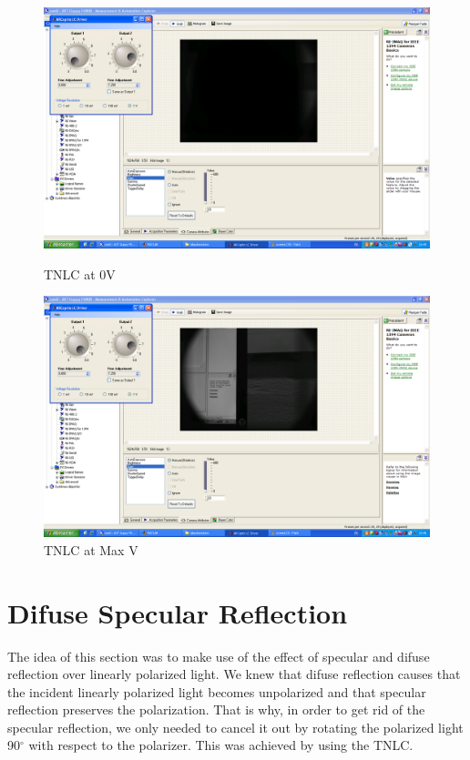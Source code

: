 \documentclass{article}
\begin{document}
\begin{figure}[H]
\centering
\begin{minipage}[b]{0.45\linewidth}
\includegraphics[width=1.0\textwidth,natwidth=100,natheight=100]{../CPM/screenLC0.PNG}
  \caption{TNLC at 0V }
  \label{fig:cpm2-1}
\end{minipage}
\quad
\begin{minipage}[b]{0.45\linewidth}
\includegraphics[width=1.0\textwidth,natwidth=100,natheight=100]{../CPM/screenLC90.PNG}
  \caption{TNLC at Max V}
  \label{fig:cpm2-2}
\end{minipage}
\end{figure}

\section{Difuse Specular Reflection}

The idea of this section was to make use of the effect of specular and difuse reflection
over linearly polarized light.
We knew that difuse reflection causes that the incident linearly polarized light 
becomes unpolarized and that specular reflection preserves the polarization. 
That is why, in order to get rid of the specular reflection, we only needed to 
cancel it out by rotating the polarized light 90$^\circ$ with respect to
the polarizer. This was achieved by using the TNLC.
\end{document}
